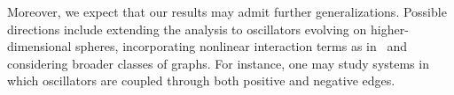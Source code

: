 \documentclass[11pt,reqno]{amsart}
\theoremstyle{definition}
\begin{document}
Moreover, we expect that our results may admit further generalizations. 
Possible directions include extending the analysis to oscillators evolving on higher-dimensional spheres, incorporating nonlinear interaction terms as in~\cite{Geshkovski2025} and considering broader classes of graphs. For instance, one may study systems in which oscillators are coupled through both positive and negative edges.



%
\setcounter{tocdepth}{1}%
\vspace*{1cm}
\end{document}

